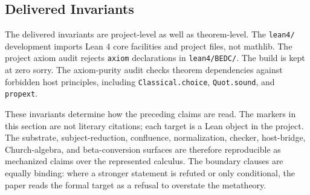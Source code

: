 \subsection{Delivered Invariants}
\label{subsec:session-metatheory-delivered-invariants}

The delivered invariants are project-level as well as theorem-level.  The
\texttt{lean4/} development imports Lean 4 core facilities and project files,
not mathlib.  The project axiom audit rejects \texttt{axiom} declarations in
\texttt{lean4/BEDC/}.  The build is kept at zero sorry.  The axiom-purity
audit checks theorem dependencies against forbidden host principles, including
\texttt{Classical.choice}, \texttt{Quot.sound}, and \texttt{propext}.

These invariants determine how the preceding claims are read.  The markers in
this section are not literary citations; each target is a Lean object in the
project.  The substrate, subject-reduction, confluence, normalization,
checker, host-bridge, Church-algebra, and beta-conversion surfaces are
therefore reproducible as mechanized claims over the represented calculus.
The boundary clauses are equally binding: where a stronger statement is
refuted or only conditional, the paper reads the formal target as a refusal to
overstate the metatheory.
